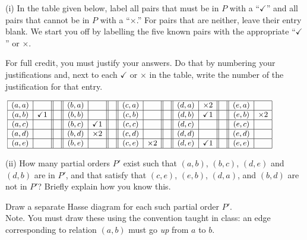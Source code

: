 \documentclass[12pt]{article}
\begin{document}
	(i) In the table given below, label all pairs that must be in $P$ with a ``$\checkmark$''
	and all pairs that cannot be in $P$ with a ``$\times$.'' For pairs that are neither,
	leave their entry blank. We start you off by labelling the five known pairs with
	the appropriate ``$\checkmark$'' or $\times.$

	\smallskip

	For full credit, you must justify your answers. Do that by numbering your justifications
	and, next to each $\checkmark$ or $\times$ in the table, write the number of the
	justification for that entry.

	\medskip

	\[
		\small \hspace*{-.5in}
		\begin{array}{|c|c||c||c|c||c||c|c||c||c|c||c||c|c|}
			\hline
			(a,a) & \quad        &  & (b,a) &              &  & (c,a) & \quad    &  & (d,a) & \times 2     &  & (e,a) & \quad    \\
			\hline
			(a,b) & \checkmark 1 &  & (b,b) &              &  & (c,b) &          &  & (d,b) & \checkmark 1 &  & (e,b) & \times 2 \\
			\hline
			(a,c) &              &  & (b,c) & \checkmark 1 &  & (c,c) &          &  & (d,c) &              &  & (e,c) &          \\
			\hline
			(a,d) &              &  & (b,d) & \times 2     &  & (c,d) &          &  & (d,d) &              &  & (e,d) &          \\
			\hline
			(a,e) &              &  & (b,e) &              &  & (c,e) & \times 2 &  & (d,e) & \checkmark 1 &  & (e,e) &          \\
			\hline
		\end{array}
	\]

	\medskip

	\bigskip

	(ii) How many partial orders $P'$ exist such that $(a,b)$, $(b, c)$, $(d,e)$ and
	$(d, b)$ are in $P'$, and that satisfy that $(c,e)$, $(e,b)$, $(d,a)$, and $(b,
	d)$ are not in $P'$? Briefly explain how you know this.

	Draw a separate Hasse diagram for each such partial order $P'.$\\
	Note. You must draw these using the convention taught in class: an edge corresponding
	to relation $(a,b)$ must go {\em up} from $a$ to $b.$

	\bigskip
\end{document}
